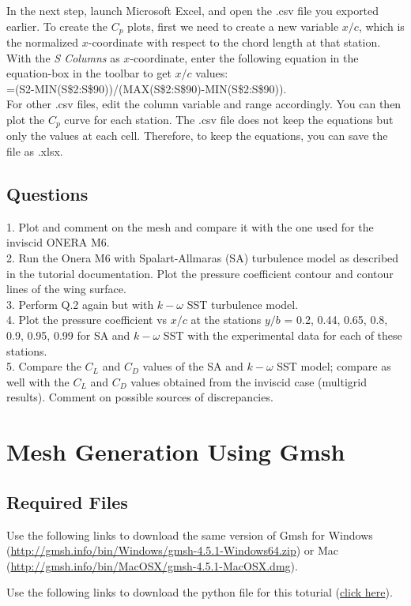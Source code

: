 In the next step, launch Microsoft Excel, and open the .csv file you exported earlier. To create the $C_p$ plots, first we need to create a new
variable $x/c$, which is the normalized $x$-coordinate with respect to the chord length at that station. With the \textit{S Columns} as $x$-coordinate, enter the following equation in the equation-box in the toolbar to get $x/c$ values: \\
=(S2-MIN(S\$2:S\$90))/(MAX(S\$2:S\$90)-MIN(S\$2:S\$90)). \\
For other .csv files, edit the column variable and range accordingly. You can then plot the $C_p$ curve for each station. The .csv file does not keep the equations but only the values at each cell. Therefore, to keep the equations, you can save the file as .xlsx.
\fi
\clearpage
\section{Questions}
1. Plot and comment on the mesh and compare it with the one used for the inviscid ONERA M6. \\
2. Run the Onera M6 with Spalart-Allmaras (SA) turbulence model as described in the tutorial documentation. Plot the pressure coefficient contour and contour lines of the wing surface. \\
3. Perform Q.2 again but with $k-\omega$ SST turbulence model. \\
4. Plot the pressure coefficient vs $x/c$ at the stations $y/b$ = 0.2, 0.44, 0.65, 0.8, 0.9, 0.95, 0.99 for SA and $k-\omega$ SST with the
experimental data \cite{schmitt1979pressure} for each of these stations. \\
5. Compare the $C_L$ and $C_D$ values of the SA and $k-\omega$ SST model; compare as well with the $C_L$ and $C_D$ values obtained from
the inviscid case (multigrid results). Comment on possible sources of discrepancies.
\chapter{Mesh Generation Using Gmsh}
\label{ch:Mesh Generation Unisg Gmsh}
\section{Required Files}
\begin{gmshnote}
	Use the following links to download the same version of Gmsh for Windows (\href{}{http://gmsh.info/bin/Windows/gmsh-4.5.1-Windows64.zip}) or Mac (\href{}{http://gmsh.info/bin/MacOSX/gmsh-4.5.1-MacOSX.dmg}).
\end{gmshnote}
\begin{pythonnote}
	Use the following links to download the python file for this toturial (\href{}{click here}).
\end{pythonnote}
